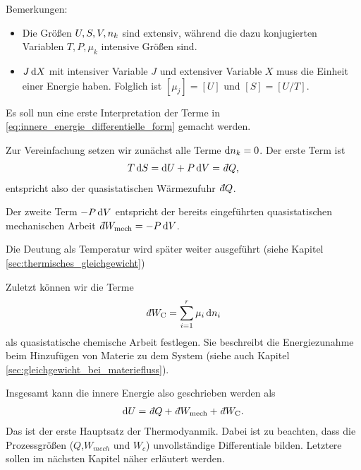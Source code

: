 Bemerkungen:
\begin{itemize}
    \item Die Größen $U, S,V,n_k$ sind extensiv, während die dazu konjugierten Variablen $T,P,\mu_k$ intensive Größen sind.
    \item $J\mathop{}\!\mathrm{d} X$ mit intensiver Variable $J$ und extensiver Variable $X$ muss die Einheit einer Energie haben. Folglich ist $[\mu_j] = [U]$ und $[S]=[U/T]$.
\end{itemize}

Es soll nun eine erste Interpretation der Terme in \eqref{eq:innere_energie_differentielle_form} gemacht werden.

Zur Vereinfachung setzen wir zunächst alle Terme $\mathop{}\!\mathrm{d} n_k=0$.
Der erste Term ist
\begin{align*}
    T\diff S = \diff U+ P\diff V = \udiff Q,
\end{align*}
entspricht also der quasistatischen Wärmezufuhr $\udiff Q$.

Der zweite Term $-P\mathop{}\!\mathrm{d} V$ entspricht der bereits eingeführten quasistatischen mechanischen Arbeit $\udiff W_\mathrm{mech}=-P\diff V$.


Die Deutung als Temperatur wird später weiter ausgeführt (siehe Kapitel \ref{sec:thermisches_gleichgewicht})

Zuletzt können wir die Terme
\begin{align*}
    \udiff W_ \mathrm{C} = \sum_{i = 1}^r \mu_i\diff \sm_i
\end{align*}
als quasistatische chemische Arbeit festlegen. Sie beschreibt die Energiezunahme beim Hinzufügen von Materie zu dem System (siehe auch Kapitel \ref{sec:gleichgewicht_bei_materiefluss}).

Insgesamt kann die innere Energie also geschrieben werden als
\begin{align}
    \label{eq:erster_HS_TD}
    \diff U = \udiff Q + \udiff W_\mathrm{mech} + \udiff W_\mathrm{C}.
\end{align}
Das ist der erste Hauptsatz der Thermodyanmik. 
Dabei ist zu beachten, dass die Prozessgrößen ($Q$,$W_{mech}$ und $W_c$) unvollständige Differentiale bilden. Letztere sollen im nächsten Kapitel näher erläutert werden. 


